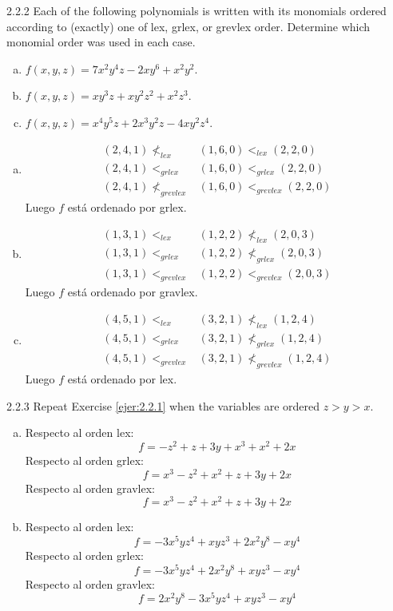 \documentclass[twoside]{article}
\newcommand{\lex}{<_{lex}}
\newcommand{\grlex}{<_{grlex}}
\newcommand{\grevlex}{<_{grevlex}}
\begin{document}
\begin{ejercicio}{2.2.2}
Each of the following polynomials is written with its monomials ordered according to (exactly) one of lex, grlex, or grevlex order. Determine which monomial order was used in each case.
\begin{enumerate}[a.]
\item $f(x,y,z) = 7x^2y^4z - 2xy^6 + x^2y^2$.
\item $f(x,y,z) = xy^3z + xy^2z^2 + x^2z^3$.
\item $f(x,y,z) = x^4y^5z + 2x^3y^2z - 4xy^2z^4$.
\end{enumerate}
\end{ejercicio}
\begin{solucion}\mbox{}
\begin{enumerate}[a.]
\item
\begin{align*}
(2,4,1) \not\lex & (1,6,0) \lex (2,2,0)\\
(2,4,1) \grlex & (1,6,0) \grlex (2,2,0)\\
(2,4,1) \not\grevlex & (1,6,0) \grevlex (2,2,0)
\end{align*}
Luego $f$ está ordenado por grlex.
\item
\begin{align*}
(1,3,1) \lex & (1,2,2) \not\lex (2,0,3)\\
(1,3,1) \grlex & (1,2,2) \not\grlex (2,0,3)\\
(1,3,1) \grevlex & (1,2,2) \grevlex (2,0,3)
\end{align*}
Luego $f$ está ordenado por gravlex.
\item
\begin{align*}
(4,5,1) \lex & (3,2,1) \not\lex (1,2,4)\\
(4,5,1) \grlex & (3,2,1) \not\grlex (1,2,4)\\
(4,5,1) \grevlex & (3,2,1) \not\grevlex (1,2,4)
\end{align*}
Luego $f$ está ordenado por lex.
\end{enumerate}
\end{solucion}

\newpage

\begin{ejercicio}{2.2.3}
Repeat Exercise \ref{ejer:2.2.1} when the variables are ordered $z > y > x$.
\end{ejercicio}
\begin{solucion}\mbox{}
\begin{enumerate}[a.]
\item Respecto al orden lex:
 \[ f = -z^2 + z + 3y + x^3 + x^2 + 2x \]
 Respecto al orden grlex:
 \[ f = x^3 - z^2 + x^2  + z + 3y + 2x \]
 Respecto al orden gravlex:
 \[ f = x^3 - z^2 + x^2  + z + 3y + 2x \]
\item Respecto al orden lex:
 \[ f = -3x^5yz^4 + xyz^3 + 2x^2y^8 - xy^4 \]
 Respecto al orden grlex:
 \[ f = -3x^5yz^4 + 2x^2y^8 + xyz^3 - xy^4 \]
 Respecto al orden gravlex:
 \[ f = 2x^2y^8 - 3x^5yz^4 + xyz^3 - xy^4 \]
\end{enumerate}
\end{solucion}
\end{document}
